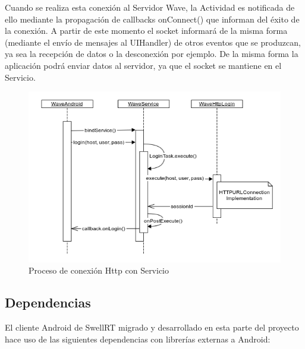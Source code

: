       Cuando se realiza esta conexión al Servidor Wave, la Actividad es notificada de ello mediante la propagación de callbacks onConnect() que informan del éxito de la conexión. A partir de este momento el socket informará de la misma forma (mediante el envío de mensajes al UIHandler) de otros eventos que se produzcan, ya sea la recepción de datos o la desconexión por ejemplo. De la misma forma la aplicación podrá enviar datos al servidor, ya que el socket se mantiene en el Servicio. 
      
        \begin{figure}[!]
   \centering
	\includegraphics[keepaspectratio, scale=0.6]{Media/Diagrams/loginHttpSequenceDiagram.png}
    \caption{Proceso de conexión Http con Servicio}
   \label{fig:sequenceDiagram_waveHttp}
  \end{figure}
      
    \subsection{Dependencias}
    
    El cliente Android de SwellRT migrado y desarrollado en esta parte del proyecto hace uso de las siguientes dependencias con librerías externas a Android:

